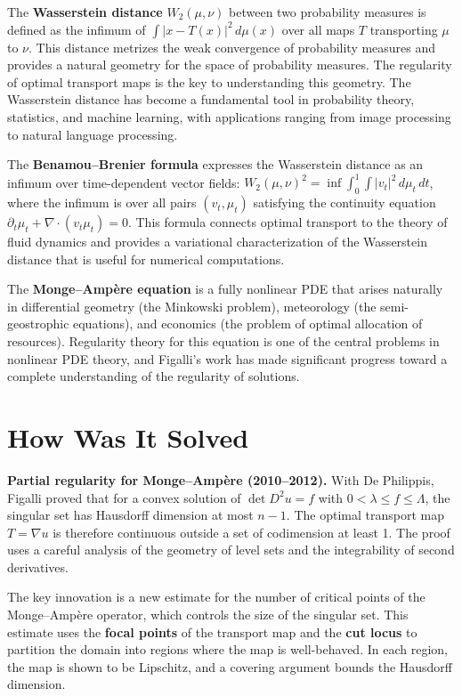 The \textbf{Wasserstein distance} $W_2(\mu, \nu)$ between two probability measures is defined as the infimum of $\int |x - T(x)|^2\,d\mu(x)$ over all maps $T$ transporting $\mu$ to $\nu$. This distance metrizes the weak convergence of probability measures and provides a natural geometry for the space of probability measures. The regularity of optimal transport maps is the key to understanding this geometry. The Wasserstein distance has become a fundamental tool in probability theory, statistics, and machine learning, with applications ranging from image processing to natural language processing.

The \textbf{Benamou--Brenier formula} expresses the Wasserstein distance as an infimum over time-dependent vector fields: $W_2(\mu, \nu)^2 = \inf \int_0^1 \int |v_t|^2\,d\mu_t\,dt$, where the infimum is over all pairs $(v_t, \mu_t)$ satisfying the continuity equation $\partial_t \mu_t + \nabla \cdot (v_t \mu_t) = 0$. This formula connects optimal transport to the theory of fluid dynamics and provides a variational characterization of the Wasserstein distance that is useful for numerical computations.

The \textbf{Monge--Amp\`ere equation} is a fully nonlinear PDE that arises naturally in differential geometry (the Minkowski problem), meteorology (the semi-geostrophic equations), and economics (the problem of optimal allocation of resources). Regularity theory for this equation is one of the central problems in nonlinear PDE theory, and Figalli's work has made significant progress toward a complete understanding of the regularity of solutions.

\section{How Was It Solved}

\textbf{Partial regularity for Monge--Amp\`ere (2010--2012).} With De Philippis, Figalli proved that for a convex solution of $\det D^2 u = f$ with $0 < \lambda \le f \le \Lambda$, the singular set has Hausdorff dimension at most $n-1$. The optimal transport map $T = \nabla u$ is therefore continuous outside a set of codimension at least 1. The proof uses a careful analysis of the geometry of level sets and the integrability of second derivatives.

The key innovation is a new estimate for the number of critical points of the Monge--Amp\`ere operator, which controls the size of the singular set. This estimate uses the \textbf{focal points} of the transport map and the \textbf{cut locus} to partition the domain into regions where the map is well-behaved. In each region, the map is shown to be Lipschitz, and a covering argument bounds the Hausdorff dimension.

